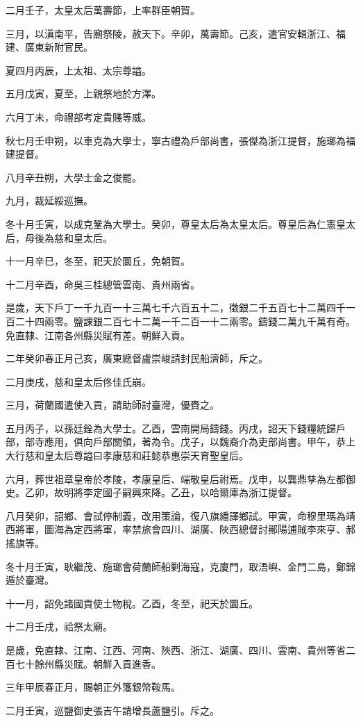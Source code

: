 \begin{pinyinscope}
二月壬子，太皇太后萬壽節，上率群臣朝賀。

三月，以滇南平，告廟祭陵，赦天下。辛卯，萬壽節。己亥，遣官安輯浙江、福建、廣東新附官民。

夏四月丙辰，上太祖、太宗尊謚。

五月戊寅，夏至，上親祭地於方澤。

六月丁未，命禮部考定貴賤等威。

秋七月壬申朔，以車克為大學士，寧古禮為戶部尚書，張傑為浙江提督，施瑯為福建提督。

八月辛丑朔，大學士金之俊罷。

九月，裁延綏巡撫。

冬十月壬寅，以成克鞏為大學士。癸卯，尊皇太后為太皇太后。尊皇后為仁憲皇太后，母後為慈和皇太后。

十一月辛巳，冬至，祀天於圜丘，免朝賀。

十二月辛酉，命吳三桂總管雲南、貴州兩省。

是歲，天下戶丁一千九百一十三萬七千六百五十二，徵銀二千五百七十二萬四千一百二十四兩零。鹽課銀二百七十二萬一千二百一十二兩零。鑄錢二萬九千萬有奇。免直隸、江南各州縣災賦有差。朝鮮入貢。

二年癸卯春正月己亥，廣東總督盧崇峻請封民船濟師，斥之。

二月庚戌，慈和皇太后佟佳氏崩。

三月，荷蘭國遣使入貢，請助師討臺灣，優賚之。

五月丙子，以孫廷銓為大學士。乙酉，雲南開局鑄錢。丙戌，詔天下錢糧統歸戶部，部寺應用，俱向戶部關領，著為令。戊子，以魏裔介為吏部尚書。甲午，恭上大行慈和皇太后尊謚曰孝康慈和莊懿恭惠崇天育聖皇后。

六月，葬世祖章皇帝於孝陵，孝康皇后、端敬皇后祔焉。戊申，以龔鼎孳為左都御史。乙卯，故明將李定國子嗣興來降。乙丑，以哈爾庫為浙江提督。

八月癸卯，詔鄉、會試停制義，改用策論，復八旗繙譯鄉試。甲寅，命穆里瑪為靖西將軍，圖海為定西將軍，率禁旅會四川、湖廣、陜西總督討鄖陽逋賊李來亨、郝搖旗等。

冬十月壬寅，耿繼茂、施瑯會荷蘭師船剿海寇，克廈門，取浯嶼、金門二島，鄭錦遁於臺灣。

十一月，詔免諸國貢使土物稅。乙酉，冬至，祀天於圜丘。

十二月壬戌，祫祭太廟。

是歲，免直隸、江南、江西、河南、陜西、浙江、湖廣、四川、雲南、貴州等省二百七十餘州縣災賦。朝鮮入貢進香。

三年甲辰春正月，賜朝正外籓銀幣鞍馬。

二月壬寅，巡鹽御史張吉午請增長蘆鹽引。斥之。


\end{pinyinscope}

